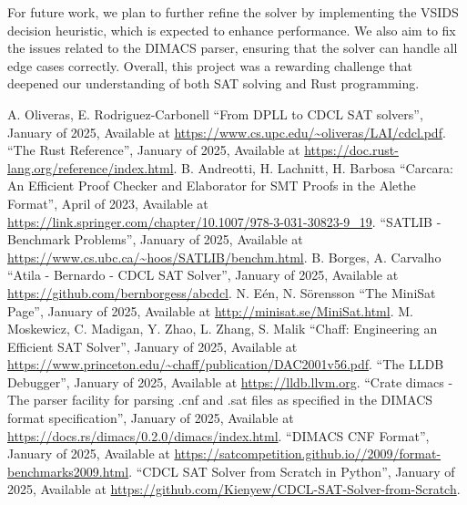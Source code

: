 \documentclass[a4paper,12pt]{article}
\begin{document}
For future work, we plan to further refine the solver by implementing the VSIDS decision heuristic,
which is expected to enhance performance. We also aim to fix the issues related to the DIMACS parser,
ensuring that the solver can handle all edge cases correctly. Overall, this project was a rewarding
challenge that deepened our understanding of both SAT solving and Rust programming.

\begin{thebibliography}{00}
             A. Oliveras, E. Rodriguez-Carbonell ``From DPLL to CDCL SAT solvers'', January of 2025, Available at \url{https://www.cs.upc.edu/~oliveras/LAI/cdcl.pdf}.
                  ``The Rust Reference'', January of 2025, Available at \url{https://doc.rust-lang.org/reference/index.html}.
                   B. Andreotti, H. Lachnitt, H. Barbosa ``Carcara: An Efficient Proof Checker and Elaborator for SMT Proofs in the Alethe Format'', April of 2023, Available at \url{https://link.springer.com/chapter/10.1007/978-3-031-30823-9\_19}.
             ``SATLIB - Benchmark Problems'', January of 2025, Available at \url{https://www.cs.ubc.ca/~hoos/SATLIB/benchm.html}.
              B. Borges, A. Carvalho ``Atila - Bernardo - CDCL SAT Solver'', January of 2025, Available at \url{https://github.com/bernborgess/abcdcl}.
                   N. Eén, N. Sörensson ``The MiniSat Page'', January of 2025, Available at \url{http://minisat.se/MiniSat.html}.
                     M. Moskewicz, C. Madigan, Y. Zhao, L. Zhang, S. Malik ``Chaff: Engineering an Efficient SAT Solver'', January of 2025, Available at \url{https://www.princeton.edu/~chaff/publication/DAC2001v56.pdf}.
                      ``The LLDB Debugger'', January of 2025, Available at \url{https://lldb.llvm.org}.
               ``Crate dimacs - The parser facility for parsing .cnf and .sat files as specified in the DIMACS format specification'', January of 2025, Available at \url{https://docs.rs/dimacs/0.2.0/dimacs/index.html}.
              ``DIMACS CNF Format'', January of 2025, Available at \url{https://satcompetition.github.io//2009/format-benchmarks2009.html}.
                ``CDCL SAT Solver from Scratch in Python'', January of 2025, Available at \url{https://github.com/Kienyew/CDCL-SAT-Solver-from-Scratch}.
\end{thebibliography}
\end{document}
